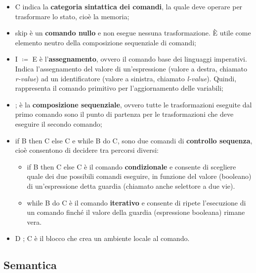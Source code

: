 \documentclass[a4paper]{article}
\begin{document}
 	\begin{itemize}
 		\item \textsf{C} indica la \textbf{categoria sintattica dei comandi}, la quale deve operare per trasformare lo stato, cioè la memoria;
 		
 		\item \textsf{skip} è un \textbf{comando nullo} e non esegue nessuna trasformazione. È utile come elemento neutro della composizione sequenziale di comandi;
 		
 		\item \textsf{I $\coloneq$ E} è l'\textbf{assegnamento}, ovvero il comando base dei linguaggi imperativi. Indica l'assegnamento del valore di un'espressione (valore a destra, chiamato \emph{r-value}) ad un identificatore (valore a sinistra, chiamato \emph{l-value}). Quindi, rappresenta il comando primitivo per l'aggiornamento delle variabili;
 		
 		\item \textsf{;} è la \textbf{composizione sequenziale}, ovvero tutte le trasformazioni eseguite dal primo comando sono il punto di partenza per le trasformazioni che deve eseguire il secondo comando;
 		
 		\item \textsf{if B then C else C} e \textsf{while B do C}, sono due comandi di \textbf{controllo sequenza}, cioè consentono di decidere tra percorsi diversi:
 		\begin{itemize}
 			\item \textsf{if B then C else C} è il comando \textbf{condizionale} e consente di scegliere quale dei due possibili comandi eseguire, in funzione del valore (booleano) di un'espressione detta guardia (chiamato anche selettore a due vie).
 			
 			\item \textsf{while B do C} è il comando \textbf{iterativo} e consente di ripete l'esecuzione di un comando finché il valore della guardia (espressione booleana) rimane vera.
 		\end{itemize}
 		
 		\item \textsf{D ; C} è il blocco che crea un ambiente locale al comando.
 	\end{itemize}\newpage
 	
 	\subsection{Semantica}
 	
\end{document}
